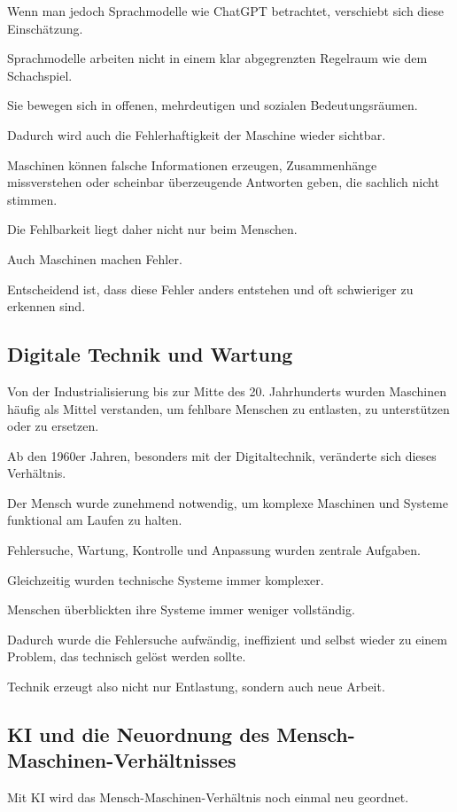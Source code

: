 Wenn man jedoch Sprachmodelle wie ChatGPT betrachtet,
verschiebt sich diese Einschätzung.

Sprachmodelle arbeiten nicht in einem klar abgegrenzten Regelraum
wie dem Schachspiel.

Sie bewegen sich in offenen,
mehrdeutigen und sozialen Bedeutungsräumen.

Dadurch wird auch die Fehlerhaftigkeit der Maschine
wieder sichtbar.

Maschinen können falsche Informationen erzeugen,
Zusammenhänge missverstehen
oder scheinbar überzeugende Antworten geben,
die sachlich nicht stimmen.

Die Fehlbarkeit liegt daher nicht nur beim Menschen.

Auch Maschinen machen Fehler.

Entscheidend ist,
dass diese Fehler anders entstehen
und oft schwieriger zu erkennen sind.

\subsection{Digitale Technik und Wartung}

Von der Industrialisierung bis zur Mitte des 20. Jahrhunderts
wurden Maschinen häufig als Mittel verstanden,
um fehlbare Menschen zu entlasten,
zu unterstützen oder zu ersetzen.

Ab den 1960er Jahren,
besonders mit der Digitaltechnik,
veränderte sich dieses Verhältnis.

Der Mensch wurde zunehmend notwendig,
um komplexe Maschinen und Systeme
funktional am Laufen zu halten.

Fehlersuche,
Wartung,
Kontrolle und Anpassung
wurden zentrale Aufgaben.

Gleichzeitig wurden technische Systeme immer komplexer.

Menschen überblickten ihre Systeme
immer weniger vollständig.

Dadurch wurde die Fehlersuche
aufwändig,
ineffizient
und selbst wieder zu einem Problem,
das technisch gelöst werden sollte.

Technik erzeugt also nicht nur Entlastung,
sondern auch neue Arbeit.

\subsection{KI und die Neuordnung des Mensch-Maschinen-Verhältnisses}

Mit KI wird das Mensch-Maschinen-Verhältnis
noch einmal neu geordnet.

